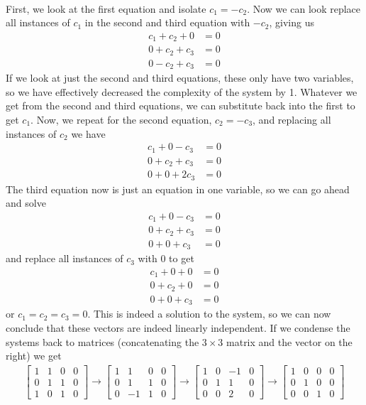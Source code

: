 \\
First, we look at the first equation and isolate $c_1=-c_2$. Now we can look replace all instances of $c_1$ in the second and third equation with $-c_2$, giving us \begin{align*}
	c_1 + c_2 + 0 &= 0 \\
	0 +  c_2 +  c_3 &= 0\\
	0 - c_2 +c_3 &= 0
\end{align*}
If we look at just the second and third equations, these only have two variables, so we have effectively decreased the complexity of the system by 1. Whatever we get from the second and third equations, we can substitute back into the first to get $c_1$.
Now, we repeat for the second equation, $c_2=-c_3$, and replacing all instances of $c_2$ we have \begin{align*}
	c_1 + 0 - c_3 &= 0 \\
	0 +  c_2 +  c_3 &= 0\\
	0 + 0 + 2c_3 &= 0
\end{align*}
The third equation now is just an equation in one variable, so we can go ahead and solve \begin{align*}
	c_1 + 0 - c_3 &= 0 \\
	0 +  c_2 +  c_3 &= 0\\
	0 + 0 + c_3 &= 0
\end{align*}
and replace all instances of $c_3$ with $0$ to get 
\begin{align*}
	c_1 + 0 + 0 &= 0 \\
	0 +  c_2+  0 &= 0\\
	0 + 0 + c_3 &= 0
\end{align*}
or $c_1=c_2=c_3=0$. This is indeed a solution to the system, so we can now conclude that these vectors are indeed linearly independent.
If we condense the systems back to matrices (concatenating the $3\times 3$ matrix and the vector on the right)  we get 
\begin{align*}
	\left[
	\begin{array}{ccc|c}
		1&1&0&0\\
		0&1&1&0\\
		1&0&1&0
	\end{array} \right] \rightarrow
	\left[\begin{array}{ccc|c}
		1&1&0&0\\
		0&1&1&0\\
		0&-1&1&0
	\end{array}\right] \rightarrow
	\left[\begin{array}{ccc|c}
		1&0&-1&0\\
		0&1&1&0\\
		0&0&2&0
	\end{array}\right]
	\rightarrow
	\left[\begin{array}{ccc|c}
		1&0&0&0\\
		0&1&0&0\\
		0&0&1&0
	\end{array}\right]
\end{align*}
